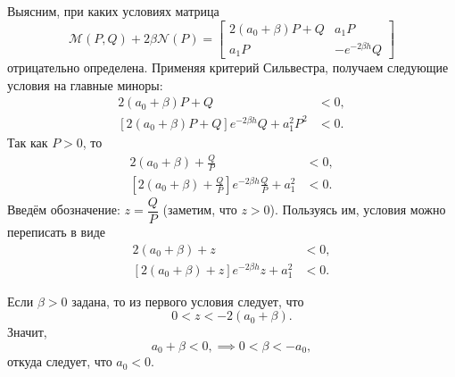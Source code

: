 \documentclass[a4paper,14pt]{article}
\begin{document}
Выясним, при каких условиях матрица
\begin{equation*}
  \mathcal{M}(P, Q) + 2 \beta \mathcal{N}(P)
  =
  \begin{bmatrix}
    2 (a_0 + \beta) P + Q & a_1 P \\
    a_1 P & - e^{-2 \beta h} Q
  \end{bmatrix}
\end{equation*}
отрицательно определена. Применяя критерий Сильвестра, получаем
следующие условия на главные миноры:
\begin{equation*}
  \begin{aligned}
    2 (a_0 + \beta) P + Q &< 0, \\
    \left[
    2 (a_0 + \beta) P + Q
    \right] e^{-2 \beta h} Q + a_1^2 P^2 &< 0.
  \end{aligned}
\end{equation*}
Так как $P > 0$, то
\begin{equation*}
  \begin{aligned}
    2 (a_0 + \beta) + \frac{Q}{P} &< 0, \\
    \left[
    2 (a_0 + \beta) + \frac{Q}{P}
    \right] e^{-2 \beta h} \frac{Q}{P} + a_1^2 &< 0.
  \end{aligned}
\end{equation*}
Введём обозначение: $z = \dfrac{Q}{P}$ (заметим, что $z > 0$). Пользуясь им,
условия можно переписать в виде
\begin{equation*}
  \begin{aligned}
    2 (a_0 + \beta) + z &< 0, \\
    \left[
    2 (a_0 + \beta) + z
    \right] e^{-2 \beta h} z + a_1^2 &< 0.
  \end{aligned}
\end{equation*}

Если $\beta > 0$ задана, то из первого условия следует, что
\begin{equation*}
  0 < z < -2 (a_0 + \beta).
\end{equation*}
Значит,
\begin{equation*}
  a_0 + \beta < 0,
  \implies
  0 < \beta < - a_0,
\end{equation*}
откуда следует, что $a_0 < 0$.
\end{document}
